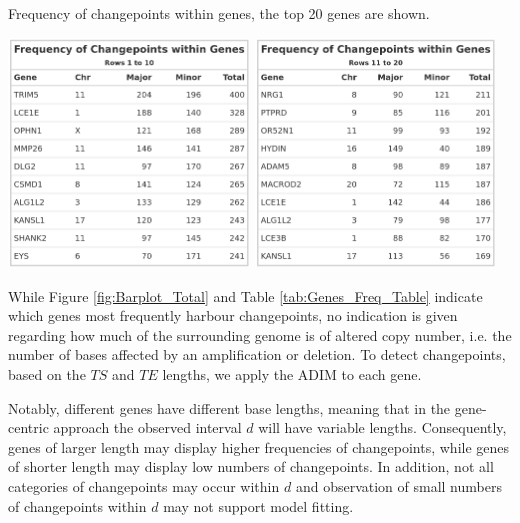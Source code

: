 \begin{table}[!htb]
\caption[Frequency of changepoints within genes, the top 20 genes are shown.]{Frequency of changepoints within genes, the top 20 genes are shown.}
\centering
\includegraphics[width = 0.48\textwidth]{../tables/Chapter_6/Gene_Table_Freq_1.png}
\includegraphics[width = 0.48\textwidth]{../tables/Chapter_6/Gene_Table_Freq_2.png}
\label{tab:Genes_Freq_Table}
\end{table}  

While Figure \ref{fig:Barplot_Total} and Table \ref{tab:Genes_Freq_Table} indicate which genes most frequently harbour changepoints, no indication is given regarding how much of the surrounding genome is of altered copy number, i.e. the number of bases affected by an amplification or deletion. To detect changepoints, based on the $TS$ and $TE$ lengths, we apply the ADIM to each gene. 

Notably, different genes have different base lengths, meaning that in the gene-centric approach the observed interval $d$ will have variable lengths. Consequently, genes of larger length may display higher frequencies of changepoints, while genes of shorter length may display low numbers of changepoints. In addition, not all categories of changepoints may occur within $d$ and observation of small numbers of changepoints within $d$ may not support model fitting.

